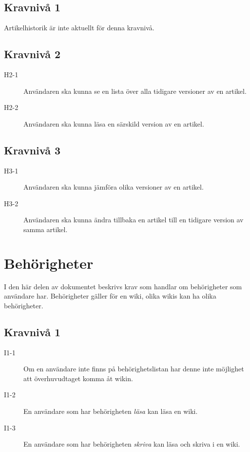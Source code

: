 \subsection{Kravnivå 1}
Artikelhistorik är inte aktuellt för denna kravnivå.

\subsection{Kravnivå 2}
\begin{description}
\item[H2-1] Användaren ska kunna se en lista över alla tidigare versioner av en artikel.
\item[H2-2] Användaren ska kunna läsa en särskild version av en artikel.
\end{description}

\subsection{Kravnivå 3}
\begin{description}
\item[H3-1] Användaren ska kunna jämföra olika versioner av en artikel.
\item[H3-2] Användaren ska kunna ändra tillbaka en artikel till en tidigare version av samma artikel.
\end{description}

\section{Behörigheter}
I den här delen av dokumentet beskrivs krav som handlar om behörigheter som användare har. Behörigheter gäller för en wiki, olika wikis kan ha olika behörigheter.

\subsection{Kravnivå 1}
\begin{description}
\item[I1-1] Om en användare inte finns på behörighetslistan har denne inte möjlighet att överhuvudtaget komma åt wikin.
\item[I1-2] En användare som har behörigheten \emph{läsa} kan läsa en wiki.
\item[I1-3] En användare som har behörigheten \emph{skriva} kan läsa och skriva i en wiki.
\end{description}


